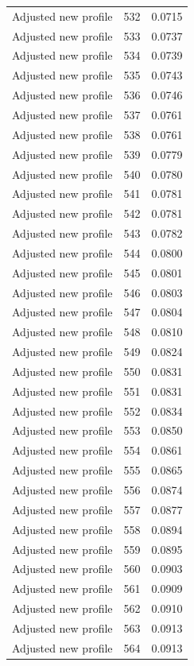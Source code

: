 \begin{table}[htbp]
\begin{tabular}{lll}
Adjusted new profile & 532 & 0.0715 \\
Adjusted new profile & 533 & 0.0737 \\
Adjusted new profile & 534 & 0.0739 \\
Adjusted new profile & 535 & 0.0743 \\
Adjusted new profile & 536 & 0.0746 \\
Adjusted new profile & 537 & 0.0761 \\
Adjusted new profile & 538 & 0.0761 \\
Adjusted new profile & 539 & 0.0779 \\
Adjusted new profile & 540 & 0.0780 \\
Adjusted new profile & 541 & 0.0781 \\
Adjusted new profile & 542 & 0.0781 \\
Adjusted new profile & 543 & 0.0782 \\
Adjusted new profile & 544 & 0.0800 \\
Adjusted new profile & 545 & 0.0801 \\
Adjusted new profile & 546 & 0.0803 \\
Adjusted new profile & 547 & 0.0804 \\
Adjusted new profile & 548 & 0.0810 \\
Adjusted new profile & 549 & 0.0824 \\
Adjusted new profile & 550 & 0.0831 \\
Adjusted new profile & 551 & 0.0831 \\
Adjusted new profile & 552 & 0.0834 \\
Adjusted new profile & 553 & 0.0850 \\
Adjusted new profile & 554 & 0.0861 \\
Adjusted new profile & 555 & 0.0865 \\
Adjusted new profile & 556 & 0.0874 \\
Adjusted new profile & 557 & 0.0877 \\
Adjusted new profile & 558 & 0.0894 \\
Adjusted new profile & 559 & 0.0895 \\
Adjusted new profile & 560 & 0.0903 \\
Adjusted new profile & 561 & 0.0909 \\
Adjusted new profile & 562 & 0.0910 \\
Adjusted new profile & 563 & 0.0913 \\
Adjusted new profile & 564 & 0.0913 \\

\end{tabular}
\end{table}
